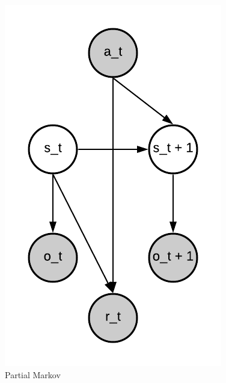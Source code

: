 \documentclass[12pt,titlepage,a4paper]{article}
\begin{document}
\begin{figure}[!htb]
      \includegraphics[width=\linewidth]{partial-markov.png}
      \caption{Partial Markov}
    \endminipage\hfill

\end{figure}
\end{document}
